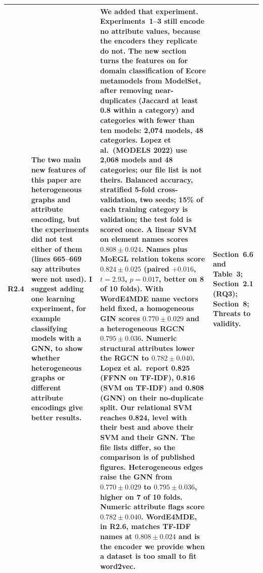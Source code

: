 \documentclass[11pt,a4paper]{article}
\begin{document}
\begin{longtable}{@{}P{1.0cm}P{4.3cm}P{5.9cm}P{3.9cm}@{}}
R2.4 &
The two main new features of this paper are heterogeneous graphs and attribute encoding, but the experiments did not test either of them (lines 665--669 say attributes were not used). I suggest adding one learning experiment, for example classifying models with a GNN, to show whether heterogeneous graphs or different attribute encodings give better results. &
We added that experiment. Experiments~1--3 still encode no attribute values, because the encoders they replicate do not. The new section turns the features on for domain classification of Ecore metamodels from ModelSet, after removing near-duplicates (Jaccard at least 0.8 within a category) and categories with fewer than ten models: 2{,}074 models, 48 categories. Lopez et al.\ (MODELS 2022) use 2{,}068 models and 48 categories; our file list is not theirs. Balanced accuracy, stratified 5-fold cross-validation, two seeds; 15\% of each training category is validation; the test fold is scored once.
A linear SVM on element names scores $0.808\pm0.024$. Names plus MoEGL relation tokens score $0.824\pm0.025$ (paired $+0.016$, $t=2.93$, $p=0.017$, better on 8 of 10 folds). With WordE4MDE name vectors held fixed, a homogeneous GIN scores $0.770\pm0.029$ and a heterogeneous RGCN $0.795\pm0.036$. Numeric structural attributes lower the RGCN to $0.782\pm0.040$.
Lopez et al.\ report 0.825 (FFNN on TF-IDF), 0.816 (SVM on TF-IDF) and 0.808 (GNN) on their no-duplicate split. Our relational SVM reaches 0.824, level with their best and above their SVM and their GNN. The file lists differ, so the comparison is of published figures. Heterogeneous edges raise the GNN from $0.770\pm0.029$ to $0.795\pm0.036$, higher on 7 of 10 folds. Numeric attribute flags score $0.782\pm0.040$. WordE4MDE, in R2.6, matches TF-IDF names at $0.808\pm0.024$ and is the encoder we provide when a dataset is too small to fit word2vec. &
Section~6.6 and Table~3; Section~2.1 (RQ3); Section~8; Threats to validity. \\
\midrule


\end{longtable}
\end{document}

